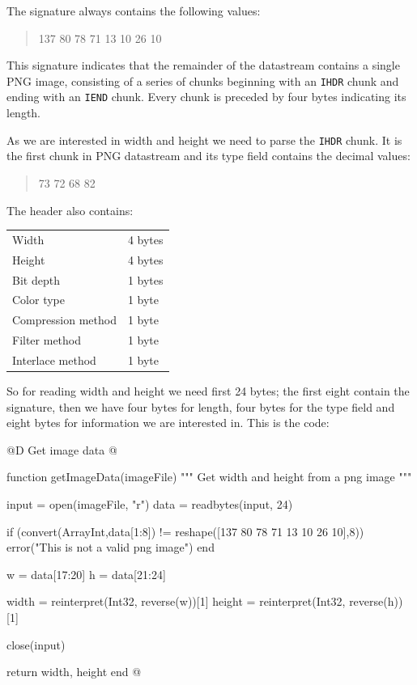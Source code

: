 \documentclass[11pt,oneside]{article}	%
\begin{document}
The signature always contains the following values:

\begin{quote}
 137 80 78 71 13 10 26 10
\end{quote}
   
This signature indicates that the remainder of the datastream contains a single PNG image, consisting of a series of chunks beginning with an \texttt{IHDR} chunk and ending with an \texttt{IEND} chunk. Every chunk is preceded by four bytes indicating its length.

As we are interested in width and height we need to parse the \texttt{IHDR} chunk. It is the first chunk in PNG datastream and its type field contains the decimal values:

\begin{quote}
 73 72 68 82
\end{quote}

The header also contains:\\

\begin{tabular}{l l}
  Width & 4 bytes\\
  Height & 4 bytes\\
  Bit depth & 1 bytes\\
  Color type & 1 byte\\
  Compression method & 1 byte\\
  Filter method & 1 byte\\
  Interlace method & 1 byte\\
\end{tabular}
\newline

So for reading width and height we need first 24 bytes; the first eight contain the signature, then we have four bytes for length, four bytes for the type field and eight bytes for information we are interested in. This is the code:

@D Get image data
@{function getImageData(imageFile)
  """
  Get width and height from a png image
  """

  input = open(imageFile, "r")
  data = readbytes(input, 24)
  
  if (convert(Array{Int},data[1:8]) != reshape([137 80 78 71 13 10 26 10],8))
    error("This is not a valid png image")
  end

  w = data[17:20]
  h = data[21:24]

  width = reinterpret(Int32, reverse(w))[1]
  height = reinterpret(Int32, reverse(h))[1]

  close(input)

  return width, height
end
@}
\end{document}
